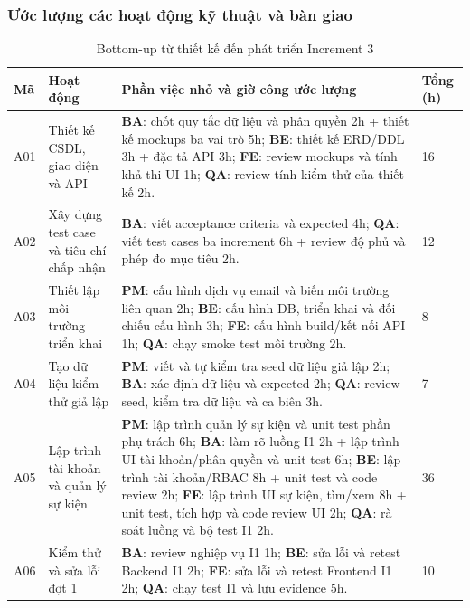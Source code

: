 \documentclass{article}
\begin{document}
\begin{landscape}
\subsubsection{Ước lượng các hoạt động kỹ thuật và bàn giao}
\begin{table}[H]
\centering
\caption{Bottom-up từ thiết kế đến phát triển Increment 3}
\small
\renewcommand{\arraystretch}{1.2}
\begin{tabularx}{\linewidth}{|p{1.1cm}|p{5.3cm}|>{\raggedright\arraybackslash}X|p{1.25cm}|}
\hline
\textbf{Mã} & \textbf{Hoạt động} & \textbf{Phần việc nhỏ và giờ công ước lượng} & \textbf{Tổng (h)} \\ \hline
A01 & Thiết kế CSDL, giao diện và API & \textbf{BA}: chốt quy tắc dữ liệu và phân quyền 2h + thiết kế mockups ba vai trò 5h; \textbf{BE}: thiết kế ERD/DDL 3h + đặc tả API 3h; \textbf{FE}: review mockups và tính khả thi UI 1h; \textbf{QA}: review tính kiểm thử của thiết kế 2h. & 16 \\ \hline
A02 & Xây dựng test case và tiêu chí chấp nhận & \textbf{BA}: viết acceptance criteria và expected 4h; \textbf{QA}: viết test cases ba increment 6h + review độ phủ và phép đo mục tiêu 2h. & 12 \\ \hline
A03 & Thiết lập môi trường triển khai & \textbf{PM}: cấu hình dịch vụ email và biến môi trường liên quan 2h; \textbf{BE}: cấu hình DB, triển khai và đối chiếu cấu hình 3h; \textbf{FE}: cấu hình build/kết nối API 1h; \textbf{QA}: chạy smoke test môi trường 2h. & 8 \\ \hline
A04 & Tạo dữ liệu kiểm thử giả lập & \textbf{PM}: viết và tự kiểm tra seed dữ liệu giả lập 2h; \textbf{BA}: xác định dữ liệu và expected 2h; \textbf{QA}: review seed, kiểm tra dữ liệu và ca biên 3h. & 7 \\ \hline
A05 & Lập trình tài khoản và quản lý sự kiện & \textbf{PM}: lập trình quản lý sự kiện và unit test phần phụ trách 6h; \textbf{BA}: làm rõ luồng I1 2h + lập trình UI tài khoản/phân quyền và unit test 6h; \textbf{BE}: lập trình tài khoản/RBAC 8h + unit test và code review 2h; \textbf{FE}: lập trình UI sự kiện, tìm/xem 8h + unit test, tích hợp và code review UI 2h; \textbf{QA}: rà soát luồng và bộ test I1 2h. & 36 \\ \hline
A06 & Kiểm thử và sửa lỗi đợt 1 & \textbf{BA}: review nghiệp vụ I1 1h; \textbf{BE}: sửa lỗi và retest Backend I1 2h; \textbf{FE}: sửa lỗi và retest Frontend I1 2h; \textbf{QA}: chạy test I1 và lưu evidence 5h. & 10 \\ \hline

\end{tabularx}
\end{table}
\end{landscape}
\end{document}
